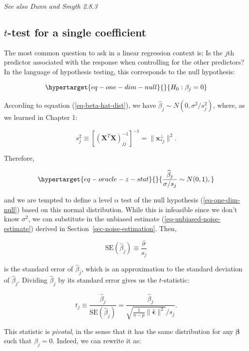 \documentclass[
  11pt,
  letterpaper,
  oneside]{book}
\theoremstyle{plain}
\theoremstyle{plain}
\theoremstyle{definition}
\theoremstyle{definition}
\theoremstyle{plain}
\theoremstyle{remark}
\begin{document}
\emph{See also Dunn and Smyth 2.8.3}

\hypertarget{t-test-for-a-single-coefficient}{%
\subsection{\texorpdfstring{\(t\)-test for a single
coefficient}{t-test for a single coefficient}}\label{t-test-for-a-single-coefficient}}

The most common question to ask in a linear regression context is: Is
the \(j\)th predictor associated with the response when controlling for
the other predictors? In the language of hypothesis testing, this
corresponds to the null hypothesis:

\begin{equation}\protect\hypertarget{eq-one-dim-null}{}{
H_0: \beta_j = 0
}\label{eq-one-dim-null}\end{equation}

According to equation (\ref{eq-beta-hat-dist}), we have
\(\widehat{\beta}_j \sim N(0, \sigma^2/s_j^2)\), where, as we learned in
Chapter 1:

\[
s_j^{2} \equiv [(\boldsymbol{X}^T \boldsymbol{X})^{-1}_{jj}]^{-1} = \|\boldsymbol{x}_{*j}^\perp\|^2.
\]

Therefore,

\begin{equation}\protect\hypertarget{eq-oracle-z-stat}{}{
\frac{\widehat{\beta}_j}{\sigma/s_j} \sim N(0,1),
}\label{eq-oracle-z-stat}\end{equation}

and we are tempted to define a level \(\alpha\) test of the null
hypothesis (\ref{eq-one-dim-null}) based on this normal distribution.
While this is infeasible since we don't know \(\sigma^2\), we can
substitute in the unbiased estimate (\ref{eq-unbiased-noise-estimate})
derived in Section~\ref{sec-noise-estimation}. Then,

\[
\text{SE}(\widehat{\beta}_j) \equiv \frac{\widehat{\sigma}}{s_j}
\]

is the standard error of \(\widehat{\beta}_j\), which is an
approximation to the standard deviation of \(\widehat{\beta}_j\).
Dividing \(\widehat{\beta}_j\) by its standard error gives us the
\(t\)-statistic:

\[
t_j \equiv \frac{\widehat{\beta}_j}{\text{SE}(\widehat{\beta}_j)} = \frac{\widehat{\beta}_j}{\sqrt{\frac{1}{n-p}\|\boldsymbol{\widehat{\epsilon}}\|^2}/s_j}.
\]

This statistic is \emph{pivotal}, in the sense that it has the same
distribution for any \(\boldsymbol{\beta}\) such that \(\beta_j = 0\).
Indeed, we can rewrite it as:
\end{document}
